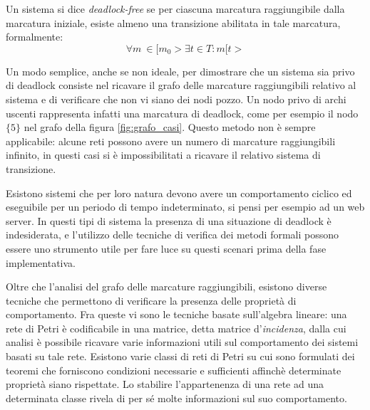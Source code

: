 \begin{definition}
\normalfont
Un sistema si dice \emph{deadlock-free} se per ciascuna marcatura
raggiungibile dalla marcatura iniziale, esiste almeno una transizione 
abilitata in tale marcatura, formalmente:
$$\forall m\ \in [m_0> \exists t \in T : m[t>$$

Un modo semplice, anche se non ideale, per dimostrare che un sistema sia
privo di deadlock consiste nel ricavare il grafo delle marcature
raggiungibili relativo al sistema e di verificare che non vi siano dei nodi
pozzo. Un nodo privo di archi uscenti rappresenta infatti una marcatura di
deadlock, come per esempio il nodo $\{ 5\}$ nel grafo della figura 
\ref{fig:grafo_casi}.
Questo metodo non è sempre applicabile: alcune reti possono avere un numero
di marcature raggiungibili infinito, in questi casi si è impossibilitati
a ricavare il relativo sistema di transizione.

Esistono sistemi che per loro natura devono avere un comportamento ciclico ed
eseguibile per un periodo di tempo indeterminato, si pensi per esempio ad un
web server. In questi tipi di sistema la presenza di una situazione 
di deadlock è indesiderata, e l'utilizzo delle tecniche di verifica
dei metodi formali possono essere uno strumento utile per fare 
luce su questi scenari prima della fase implementativa.

Oltre che l'analisi del grafo delle marcature raggiungibili, esistono
diverse tecniche che permettono di verificare la presenza
delle proprietà di comportamento. Fra queste vi sono le tecniche basate sull'algebra lineare:
una rete di Petri è codificabile in una matrice, detta matrice 
d'\emph{incidenza}, dalla cui analisi è possibile ricavare varie
informazioni utili sul comportamento dei sistemi basati su tale rete.
Esistono varie classi di reti di Petri su cui sono formulati dei teoremi 
che forniscono condizioni necessarie e sufficienti affinchè determinate
proprietà siano rispettate.
Lo stabilire l'appartenenza di una rete ad una determinata
classe rivela di per sé molte informazioni sul suo comportamento.

\end{definition}





